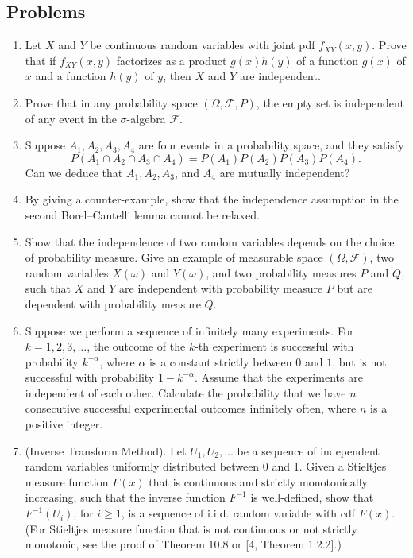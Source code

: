 \subsection*{Problems}
\begin{enumerate}
\item Let $X$ and $Y$ be continuous random variables with joint pdf $f_{XY}(x,y)$. Prove that if $f_{XY}(x,y)$ factorizes as a product $g(x) h(y)$ of a function $g(x)$ of $x$ and a function $h(y)$ of $y$, then $X$ and $Y$ are independent.
\item Prove that in any probability space $(\Omega, \mathcal{F}, P)$, the empty set is independent of any event in the $\sigma$-algebra $\mathcal{F}$.
\item Suppose $A_1,A_2,A_3,A_4$ are four events in a probability space, and they satisfy
\[
P(A_1\cap A_2\cap A_3\cap A_4) = P(A_1) P(A_2) P(A_3) P(A_4).
\]
Can we deduce that $A_1,A_2,A_3$, and $A_4$ are mutually independent?
\item By giving a counter-example, show that the independence assumption in the second Borel--Cantelli lemma cannot be relaxed.
\item Show that the independence of two random variables depends on the choice of probability measure. Give an example of measurable space $(\Omega, \mathcal{F})$, two random variables $X(\omega)$ and $Y(\omega)$, and two probability measures $P$ and $Q$, such that $X$ and $Y$ are independent with probability measure $P$ but are dependent with probability measure $Q$.
\item Suppose we perform a sequence of infinitely many experiments. For $k=1,2,3,\dots$, the outcome of the $k$-th experiment is successful with probability $k^{-\alpha}$, where $\alpha$ is a constant strictly between $0$ and $1$, but is not successful with probability $1-k^{-\alpha}$. Assume that the experiments are independent of each other. Calculate the probability that we have $n$ consecutive successful experimental outcomes infinitely often, where $n$ is a positive integer.
\item (Inverse Transform Method). Let $U_1,U_2,\dots$ be a sequence of independent random variables uniformly distributed between 0 and 1. Given a Stieltjes measure function $F(x)$ that is continuous and strictly monotonically increasing, such that the inverse function $F^{-1}$ is well-defined, show that $F^{-1}(U_i)$, for $i\ge 1$, is a sequence of i.i.d. random variable with cdf $F(x)$. (For Stieltjes measure function that is not continuous or not strictly monotonic, see the proof of Theorem 10.8 or [4, Theorem 1.2.2].)

\end{enumerate}
